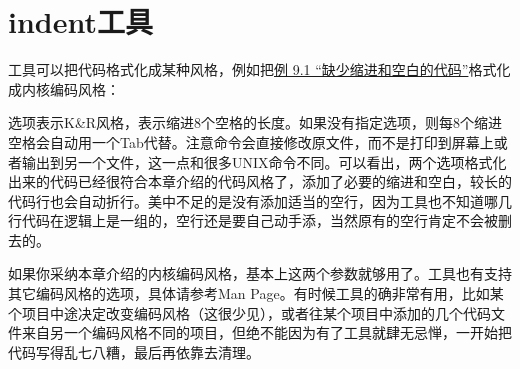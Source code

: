 
\section{indent工具}
%
工具可以把代码格式化成某种风格，例如把\hyperlink{db.ch09s01.id2737667}{例 9.\BookSplit{}1 “缺少缩进和空白的代码”}格式化成内核编码风格：




选项表示K\&R风格，表示缩进8个空格的长度。如果没有指定选项，则每8个缩进空格会自动用一个Tab代替。注意命令会直接修改原文件，而不是打印到屏幕上或者输出到另一个文件，这一点和很多UNIX命令不同。可以看出，两个选项格式化出来的代码已经很符合本章介绍的代码风格了，添加了必要的缩进和空白，较长的代码行也会自动折行。美中不足的是没有添加适当的空行，因为工具也不知道哪几行代码在逻辑上是一组的，空行还是要自己动手添，当然原有的空行肯定不会被删去的。



如果你采纳本章介绍的内核编码风格，基本上这两个参数就够用了。工具也有支持其它编码风格的选项，具体请参考Man Page。有时候工具的确非常有用，比如某个项目中途决定改变编码风格（这很少见），或者往某个项目中添加的几个代码文件来自另一个编码风格不同的项目，但绝不能因为有了工具就肆无忌惮，一开始把代码写得乱七八糟，最后再依靠去清理。

